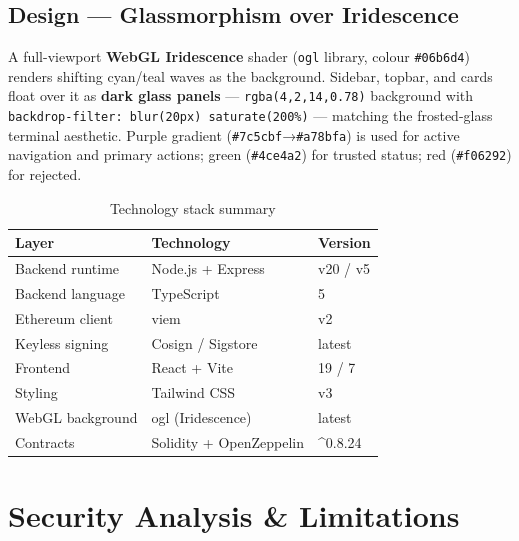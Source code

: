 \documentclass[11pt,a4paper]{article}
\begin{document}
\subsection{Design — Glassmorphism over Iridescence}
A full-viewport \textbf{WebGL Iridescence} shader (\texttt{ogl} library, colour
\texttt{\#06b6d4}) renders shifting cyan/teal waves as the background. Sidebar, topbar,
and cards float over it as \textbf{dark glass panels} —
\texttt{rgba(4,2,14,0.78)} background with \texttt{backdrop-filter:~blur(20px)~saturate(200\%)}
— matching the frosted-glass terminal aesthetic. Purple gradient
(\texttt{\#7c5cbf}→\texttt{\#a78bfa}) is used for active navigation and primary actions;
green (\texttt{\#4ce4a2}) for trusted status; red (\texttt{\#f06292}) for rejected.

\begin{table}[H]
\centering\small
\caption{Technology stack summary}
\begin{tabular}{lll}
\toprule
\textbf{Layer} & \textbf{Technology} & \textbf{Version}\\
\midrule
Backend runtime   & Node.js + Express    & v20 / v5\\
Backend language  & TypeScript           & 5\\
Ethereum client   & viem                 & v2\\
Keyless signing   & Cosign / Sigstore    & latest\\
Frontend          & React + Vite         & 19 / 7\\
Styling           & Tailwind CSS         & v3\\
WebGL background  & ogl (Iridescence)    & latest\\
Contracts         & Solidity + OpenZeppelin & \^{}0.8.24\\
\bottomrule
\end{tabular}
\end{table}

\section{Security Analysis \& Limitations}
\end{document}
